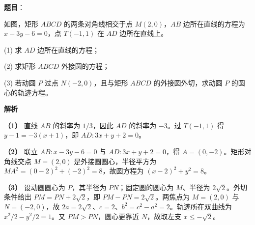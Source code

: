 \begin{answer}

\textbf{题目}：

如图，矩形 $ABCD$ 的两条对角线相交于点 $M(2,0)$，$AB$ 边所在直线的方程为 $x-3y-6=0$，点 $T(-1,1)$ 在 $AD$ 边所在直线上。

(1) 求 $AD$ 边所在直线的方程；

(2) 求矩形 $ABCD$ 外接圆的方程；

(3) 若动圆 $P$ 过点 $N(-2,0)$，且与矩形 $ABCD$ 的外接圆外切，求动圆 $P$ 的圆心的轨迹方程。
\nopagebreak[4]
\begin{center}\end{center}
\nopagebreak[4]
\textbf{解析}

\textbf{（1）} 直线 $AB$ 的斜率为 $1/3$，因此 $AD$ 的斜率为 $-3$。过 $T(-1,1)$ 得 $y-1=-3(x+1)$，即 $AD:3x+y+2=0$。

\textbf{（2）} 联立 $AB:x-3y-6=0$ 与 $AD:3x+y+2=0$，得 $A=(0,-2)$。矩形对角线交点 $M=(2,0)$ 是外接圆圆心，半径平方为 $MA^2=(0-2)^2+(-2)^2=8$，故圆方程为 $(x-2)^2+y^2=8$。

\textbf{（3）} 设动圆圆心为 $P$，其半径为 $PN$；固定圆的圆心为 $M$、半径为 $2\sqrt2$。外切条件给出 $PM=PN+2\sqrt2$，即 $PM-PN=2\sqrt2$。两焦点为 $M=(2,0)$ 与 $N=(-2,0)$，故 $2a=2\sqrt2$、$c=2$、$b^2=c^2-a^2=2$。轨迹所在双曲线为 $x^2/2-y^2/2=1$。又 $PM>PN$，圆心更靠近 $N$，故取左支 $x\leq-\sqrt2$。




\end{answer}
